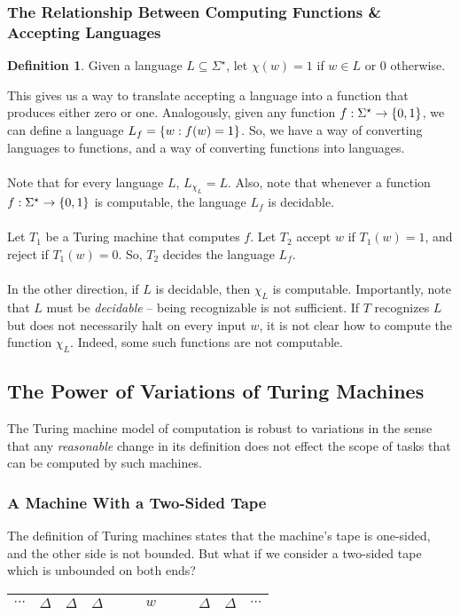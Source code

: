 \documentclass[]{article}
\DeclarePairedDelimiter{\set}{\lbrace}{\rbrace}
\theoremstyle{definition}
\newtheorem*{defn}{Definition}
\newcommand{\lecture}[1]{\marginpar{{\footnotesize $\leftarrow$ \underline{#1}}}}
\begin{document}
      \subsubsection{The Relationship Between Computing Functions \& Accepting Languages}

        \begin{defn}
          Given a language $L \subseteq \Sigma^\star$, let $\chi(w) = 1$ if $w \in L$ or $0$ otherwise.
        \end{defn}

        This gives us a way to translate accepting a language into a function that produces either zero or one. Analogously, given any function $f: \Sigma^\star \to \set{0, 1}$, we can define a language $L_f = \set{w : f(w) = 1}$. So, we have a way of converting languages to functions, and a way of converting functions into languages.
        \\ \\
        Note that for every language $L$, $L_{\chi_L} = L$. Also, note that whenever a function $f: \Sigma^\star \to \set{0, 1}$ is computable, the language $L_f$ is decidable.
        \\ \\
        Let $T_1$ be a Turing machine that computes $f$. Let $T_2$ accept $w$ if $T_1(w) = 1$, and reject if $T_1(w) = 0$. So, $T_2$ decides the language $L_f$.
        \\ \\
        In the other direction, if $L$ is decidable, then $\chi_L$ is computable. Importantly, note that $L$ must be \emph{decidable} -- being recognizable is not sufficient. If $T$ recognizes $L$ but does not necessarily halt on every input $w$, it is not clear how to compute the function $\chi_L$. Indeed, some such functions are not computable.

    \subsection{The Power of Variations of Turing Machines} \lecture{November 19, 2013}
      The Turing machine model of computation is robust to variations in the sense that any \emph{reasonable} change in its definition does not effect the scope of tasks that can be computed by such machines.

      \subsubsection{A Machine With a Two-Sided Tape}
        The definition of Turing machines states that the machine's tape is one-sided, and the other side is not bounded. But what if we consider a two-sided tape which is unbounded on both ends?
        \begin{center}
          \begin{tabular}{c|c|c|c|ccccc|c|c|c}
            \hline
            $\cdots$ & $\Delta$ & $\Delta$ & $\Delta$ & & & $w$ & & & $\Delta$ & $\Delta$ & $\cdots$ \\ \hline
          \end{tabular}
        \end{center}
\end{document}
